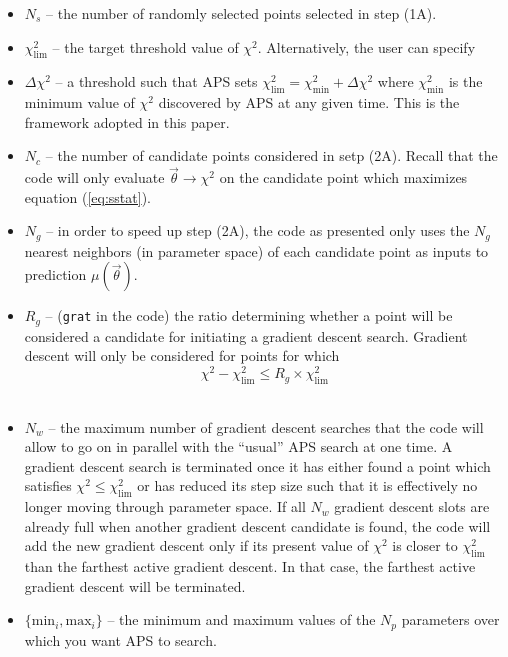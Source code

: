 \documentclass[useAMS,usenatbib]{aastex}
\begin{document}
\begin{itemize}
\item $N_s$ -- the number of randomly selected points selected in step (1A).
\\

\item $\chi^2_\text{lim}$ -- the target threshold value of $\chi^2$.  Alternatively,
the user can specify
\\
\item $\Delta \chi^2$ -- a threshold such that APS sets
$\chi^2_\text{lim}=\chi^2_\text{min}+\Delta\chi^2$ where $\chi^2_\text{min}$ is the
minimum value of $\chi^2$ discovered by APS at any given time.  This is the framework
adopted in this paper.
\\

\item $N_c$ -- the number of candidate points considered in setp (2A).  Recall
that the code will only evaluate $\vec{\theta}\rightarrow\chi^2$ on the
candidate point which maximizes equation (\ref{eq:sstat}).
\\

\item $N_g$ -- in order to speed up step (2A), the code
as presented only uses the $N_g$ nearest neighbors (in parameter space) of
each candidate point as inputs to prediction $\mu(\vec{\theta})$.
\\

\item $R_g$ -- (\verb|grat| in the code) the ratio determining whether a point
will be considered a candidate for initiating a gradient descent search. 
Gradient descent will only be considered for points for which
$$\chi^2-\chi^2_\text{lim}\le R_g\times \chi^2_\text{lim}$$
\\

\item $N_w$ -- the maximum number of gradient descent searches that the code
will allow to go on in parallel with the ``usual'' APS search at one time.  A
gradient descent search is terminated once it has either
found a point which satisfies $\chi^2\le\chi^2_\text{lim}$ or 
has reduced its step
size such that it is effectively no longer moving through parameter space.  
If all $N_w$ gradient descent slots are already full when another gradient descent
candidate is found, the code will add the new
gradient descent only if its present value of $\chi^2$ is closer to
$\chi^2_\text{lim}$ than the farthest active gradient descent.  In that case,
the farthest active gradient descent will be terminated.
\\

\item $\{\text{min}_i,\text{max}_i\}$ -- 
the minimum and maximum values of the $N_p$ parameters over which you want APS
to search.
\end{itemize}
\end{document}
